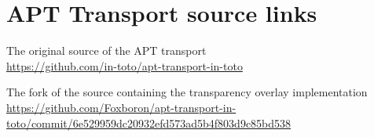 \documentclass[../Main/thesis.tex]{subfiles}
\begin{document}
\chapter{APT Transport source links}%
\label{appendix:apt-development-source}

The original source of the APT transport\\
\url{https://github.com/in-toto/apt-transport-in-toto}

The fork of the source containing the transparency overlay implementation\\
\url{https://github.com/Foxboron/apt-transport-in-toto/commit/6e529959dc20932efd573ad5b4f803d9c85bd538}
\end{document}
